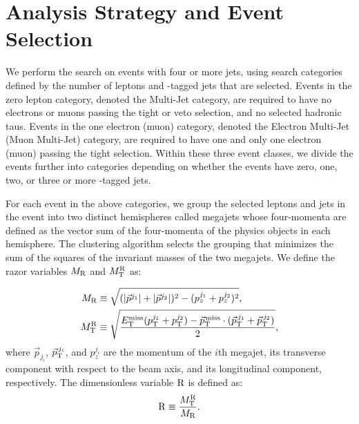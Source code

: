 \section{Analysis Strategy and Event Selection }
\label{sec:StrategySelection}

We perform the search on events with four or more jets, using search categories
defined by the number of leptons and \cPqb-tagged jets that are selected. Events in the
zero lepton category, denoted the Multi-Jet category, are required to have no 
electrons or muons passing the tight or veto selection, and no selected hadronic taus. 
Events in the one electron (muon) category, denoted the Electron Multi-Jet (Muon Multi-Jet) category,
are required to have one and only one electron (muon) passing the tight selection.
Within these three event classes, we divide the events further into categories depending on
whether the events have zero, one, two, or three or more \cPqb-tagged jets. 

For each event in the above categories, we group the selected leptons 
and jets in the event into two distinct hemispheres called megajets whose four-momenta are 
defined as the vector sum of the four-momenta of the physics objects in each hemisphere. The
clustering algorithm selects the grouping that minimizes the sum of the squares of the invariant masses
of the two megajets. We define the razor variables $M_\mathrm{R}$ and $M_\mathrm{T}^\mathrm{R}$ as:

\begin{align}
 \label{eq:MRstar}
 M_\mathrm{R} &\equiv
 \sqrt{
(\lvert \vec{p}^{j_{1}} \rvert+\lvert \vec{p}^{j_{2}} \rvert)^2 -({p}^{j_1}_z+{p}^{j_2}_z)^2},\\
M_\mathrm{T}^\mathrm{R} &\equiv \sqrt{ \frac{E_{\mathrm{T}}^{\text{miss}}(p_{\mathrm{T}}^{j_1}+p_{\mathrm{T}}^{j_2}) -
{\vec p}_{\mathrm{T}}^{\kern1pt\text{miss}} \cdot
 ({\vec p}_{\mathrm{T}}^{\,j_1}+{\vec p}_{\mathrm{T}}^{\,j_2}) }{2}},
\end{align}
where $\vec{p}_{j_i}$, ${\vec p}_{\mathrm{T}}^{\,j_i}$, and
$p^{j_i}_z$ are the momentum of the $i$th megajet, its
transverse component with respect to the beam axis, and its
longitudinal component, respectively.  The dimensionless variable $\mathrm{R}$ is defined as:
\begin{equation}
\mathrm{R} \equiv \frac{M_\mathrm{T}^\mathrm{R}}{M_\mathrm{R}}.
\end{equation}



